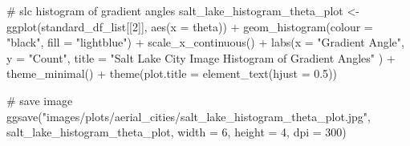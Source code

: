 \documentclass[
  letterpaper,
  DIV=11,
  numbers=noendperiod]{scrreprt}
\newenvironment{Shaded}{\begin{snugshade}}{\end{snugshade}}
\newcommand{\AttributeTok}[1]{\textcolor[rgb]{0.40,0.45,0.13}{#1}}
\newcommand{\CommentTok}[1]{\textcolor[rgb]{0.37,0.37,0.37}{#1}}
\newcommand{\DecValTok}[1]{\textcolor[rgb]{0.68,0.00,0.00}{#1}}
\newcommand{\FloatTok}[1]{\textcolor[rgb]{0.68,0.00,0.00}{#1}}
\newcommand{\FunctionTok}[1]{\textcolor[rgb]{0.28,0.35,0.67}{#1}}
\newcommand{\NormalTok}[1]{\textcolor[rgb]{0.00,0.23,0.31}{#1}}
\newcommand{\OtherTok}[1]{\textcolor[rgb]{0.00,0.23,0.31}{#1}}
\newcommand{\SpecialCharTok}[1]{\textcolor[rgb]{0.37,0.37,0.37}{#1}}
\newcommand{\StringTok}[1]{\textcolor[rgb]{0.13,0.47,0.30}{#1}}
\begin{document}
\begin{Shaded}
\begin{Highlighting}[]
\CommentTok{\# slc histogram of gradient angles}
\NormalTok{salt\_lake\_histogram\_theta\_plot }\OtherTok{\textless{}{-}}
  \FunctionTok{ggplot}\NormalTok{(standard\_df\_list[[}\DecValTok{2}\NormalTok{]], }
         \FunctionTok{aes}\NormalTok{(}\AttributeTok{x =}\NormalTok{ theta)) }\SpecialCharTok{+}
  \FunctionTok{geom\_histogram}\NormalTok{(}\AttributeTok{colour =} \StringTok{"black"}\NormalTok{, }\AttributeTok{fill =} \StringTok{"lightblue"}\NormalTok{) }\SpecialCharTok{+}
  \FunctionTok{scale\_x\_continuous}\NormalTok{() }\SpecialCharTok{+} 
  \FunctionTok{labs}\NormalTok{(}\AttributeTok{x =} \StringTok{"Gradient Angle"}\NormalTok{, }
       \AttributeTok{y =} \StringTok{"Count"}\NormalTok{, }
       \AttributeTok{title =} \StringTok{"Salt Lake City Image Histogram of Gradient Angles"}
\NormalTok{       ) }\SpecialCharTok{+}
  \FunctionTok{theme\_minimal}\NormalTok{() }\SpecialCharTok{+}
  \FunctionTok{theme}\NormalTok{(}\AttributeTok{plot.title =} \FunctionTok{element\_text}\NormalTok{(}\AttributeTok{hjust =} \FloatTok{0.5}\NormalTok{))}

\CommentTok{\# save image}
\FunctionTok{ggsave}\NormalTok{(}\StringTok{"images/plots/aerial\_cities/salt\_lake\_histogram\_theta\_plot.jpg"}\NormalTok{, salt\_lake\_histogram\_theta\_plot, }\AttributeTok{width =} \DecValTok{6}\NormalTok{, }\AttributeTok{height =} \DecValTok{4}\NormalTok{, }\AttributeTok{dpi =} \DecValTok{300}\NormalTok{)}
\end{Highlighting}
\end{Shaded}
\end{document}
